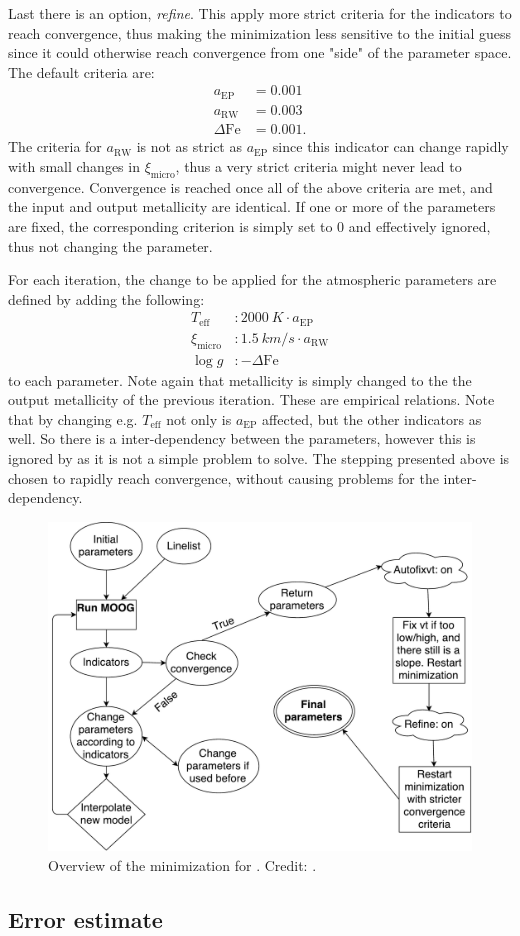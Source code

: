 Last there is an option, \emph{refine}. This apply more strict criteria for the
indicators to reach convergence, thus making the minimization less sensitive to
the initial guess since it could otherwise reach convergence from one "side" of
the parameter space. The default criteria are:
\begin{align*}
  a_\mathrm{EP}     &= 0.001\\
  a_\mathrm{RW}     &= 0.003\\
  \Delta\mathrm{Fe} &= 0.001.
\end{align*}
The criteria for $a_\mathrm{RW}$ is not as strict as $a_\mathrm{EP}$ since this
indicator can change rapidly with small changes in $\xi_\mathrm{micro}$, thus a
very strict criteria might never lead to convergence. Convergence is reached
once all of the above criteria are met, and the input and output metallicity are
identical. If one or more of the parameters are fixed, the corresponding
criterion is simply set to 0 and effectively ignored, thus not changing the
parameter.

For each iteration, the change to be applied for the atmospheric parameters are
defined by adding the following:
\begin{align}
  T_\mathrm{eff}     &: \SI{2000}{K} \cdot a_\mathrm{EP}   \\
  \xi_\mathrm{micro} &: \SI{1.5}{km/s} \cdot a_\mathrm{RW} \\
  \log g             &: -\Delta\mathrm{Fe}
\end{align}
to each parameter. Note again that metallicity is simply changed to the the
output metallicity of the previous iteration. These are empirical relations.
Note that by changing e.g. $T_\mathrm{eff}$ not only is $a_\mathrm{EP}$
affected, but the other indicators as well. So there is a inter-dependency
between the parameters, however this is ignored by \FASMA as it is not a simple
problem to solve. The stepping presented above is chosen to rapidly reach
convergence, without causing problems for the inter-dependency.

\begin{figure}[htpb!]
    \centering
    \includegraphics[width=1.0\linewidth]{figures/FASMA_minimization.pdf}
    \caption{Overview of the minimization for \FASMA. Credit: \citet{Andreasen2017a}.}
    \label{fig:minimization}
\end{figure}

\subsection{Error estimate}
